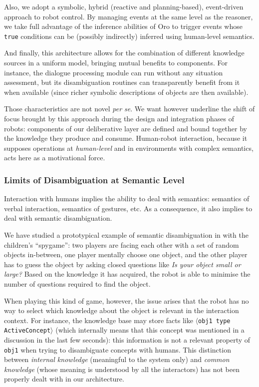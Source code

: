 \documentclass[preprint,3p,times]{elsarticle}
\newcommand{\concept}[1]{{\small \texttt{#1}}}
\newcommand{\stmt}[1]{{\footnotesize\tt$\langle$#1\relax$\rangle$}}
\begin{document}
Also, we adopt a symbolic, hybrid (reactive and planning-based), event-driven
approach to robot control. By managing events at the same level as the reasoner,
we take full advantage of the inference abilities of {\sc Oro} to trigger events
whose \texttt{true} conditions can be (possibly indirectly) inferred using
human-level semantics.

And finally, this architecture allows for the combination of different
knowledge sources in a uniform model, bringing mutual
benefits to components. For instance, the dialogue processing module can
run without any situation assessment, but its disambiguation routines
can transparently benefit from it when available (since richer symbolic
descriptions of objects are then available).

Those characteristics are not novel \emph{per se}. We want however underline the
shift of focus brought by this approach during the design and integration phases
of robots: components of our deliberative layer are defined and bound together
by the knowledge they produce and consume. Human-robot interaction, because it
supposes operations at \emph{human-level} and in environments with complex
semantics, acts here as a motivational force.


\subsubsection{Limits of Disambiguation at Semantic Level}

Interaction with humans implies the ability to deal with semantics: semantics of
verbal interaction, semantics of gestures, etc.  As a consequence, it also
implies to deal with semantic disambiguation.

We have studied a prototypical example of semantic disambiguation in
\cite{Ros2010b} with the children's ``spygame'': two players are facing
each other with a set of random objects in-between, one player mentally choose
one object, and the other player has to guess the object by asking closed
questions like \emph{Is your object small or large?} Based on the knowledge it
has acquired, the robot is able to minimise the number of questions required to
find the object.

When playing this kind of game, however, the issue arises that the robot has no
way to select which knowledge about the object is relevant in the interaction
context. For instance, the knowledge base may store facts like \stmt{obj1 type
ActiveConcept} (which internally means that this concept was mentioned in a
discussion in the last few seconds): this information is not a relevant
property of \concept{obj1} when trying to disambiguate concepts with humans.
This distinction between \emph{internal knowledge} (meaningful to
the system only) and \emph{common knowledge} (whose meaning is understood by
all the interactors) has not been properly dealt with in our architecture.
\end{document}
